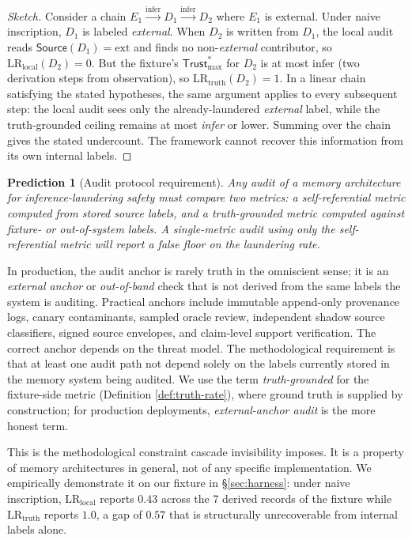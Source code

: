 \documentclass[11pt]{article}
\newtheorem{prediction}{Prediction}
\newcommand{\Source}{\mathsf{Source}}
\newcommand{\Trust}{\mathsf{Trust}}
\newcommand{\ext}{\ensuremath{\mathrm{ext}}}
\newcommand{\infer}{\ensuremath{\mathrm{infer}}}
\begin{document}
\begin{proof}[Sketch]
Consider a chain $E_1 \xrightarrow{\text{infer}} D_1 \xrightarrow{\text{infer}} D_2$ where $E_1$ is external. Under naive inscription, $D_1$ is labeled \emph{external}. When $D_2$ is written from $D_1$, the local audit reads $\Source(D_1) = \ext$ and finds no non-\emph{external} contributor, so $\mathrm{LR}_{\text{local}}(D_2) = 0$. But the fixture's $\Trust_{\max}^*$ for $D_2$ is at most $\infer$ (two derivation steps from observation), so $\mathrm{LR}_{\text{truth}}(D_2) = 1$. In a linear chain satisfying the stated hypotheses, the same argument applies to every subsequent step: the local audit sees only the already-laundered \emph{external} label, while the truth-grounded ceiling remains at most \emph{infer} or lower. Summing over the chain gives the stated undercount. The framework cannot recover this information from its own internal labels.
\end{proof}

\begin{prediction}[Audit protocol requirement]
\label{pred:audit}
Any audit of a memory architecture for inference-laundering safety must compare two metrics: a self-referential metric computed from stored source labels, and a truth-grounded metric computed against fixture- or out-of-system labels. A single-metric audit using only the self-referential metric will report a false floor on the laundering rate.
\end{prediction}

In production, the audit anchor is rarely truth in the omniscient sense; it is an \emph{external anchor} or \emph{out-of-band} check that is not derived from the same labels the system is auditing. Practical anchors include immutable append-only provenance logs, canary contaminants, sampled oracle review, independent shadow source classifiers, signed source envelopes, and claim-level support verification. The correct anchor depends on the threat model. The methodological requirement is that at least one audit path not depend solely on the labels currently stored in the memory system being audited. We use the term \emph{truth-grounded} for the fixture-side metric (Definition \ref{def:truth-rate}), where ground truth is supplied by construction; for production deployments, \emph{external-anchor audit} is the more honest term.

This is the methodological constraint cascade invisibility imposes. It is a property of memory architectures in general, not of any specific implementation. We empirically demonstrate it on our fixture in \S\ref{sec:harness}: under naive inscription, $\mathrm{LR}_{\text{local}}$ reports $0.43$ across the 7 derived records of the fixture while $\mathrm{LR}_{\text{truth}}$ reports $1.0$, a gap of $0.57$ that is structurally unrecoverable from internal labels alone.
\end{document}
